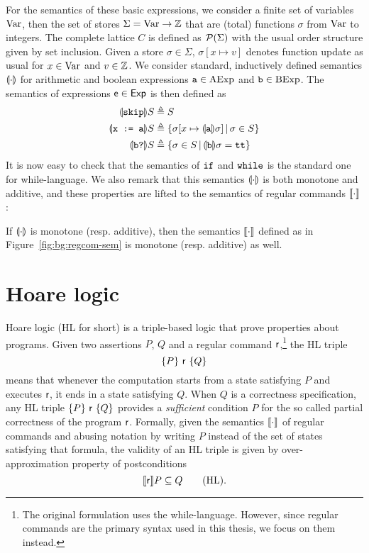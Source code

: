 For the semantics of these basic expressions, we consider a finite set of variables $\text{Var}$, then the set of stores $\Sigma = \text{Var} \rightarrow \mathbb{Z}$ that are (total) functions $\sigma$ from $\text{Var}$ to integers. The complete lattice $C$ is defined as $\mathcal{P}(\Sigma)$ with the usual order structure given by set inclusion. Given a store $\sigma \in \Sigma$, $\sigma[ x \mapsto v ]$ denotes function update as usual for $x \in \text{Var}$ and $v \in \mathbb{Z}$. We consider standard, inductively defined semantics $\llparenthesis\cdot\rrparenthesis$ for arithmetic and boolean expressions $\texttt{a} \in \text{AExp}$ and $\texttt{b} \in \text{BExp}$. The semantics of expressions $\mathsf{e} \in \mathsf{Exp}$ is then defined as
\begin{align*}
	\llparenthesis\texttt{skip}\rrparenthesis S &\triangleq S \\
	\llparenthesis\texttt{x := a}\rrparenthesis S &\triangleq \left\lbrace \sigma[x \mapsto \llparenthesis\texttt{a}\rrparenthesis \sigma] \,\vert\, \sigma \in S \right\rbrace \\
	\llparenthesis\texttt{b?}\rrparenthesis S &\triangleq \left\lbrace \sigma \in S \,\vert\, \llparenthesis\texttt{b}\rrparenthesis \sigma = \texttt{tt} \right\rbrace
\end{align*}
It is now easy to check that the semantics of $\texttt{if}$ and $\texttt{while}$ is the standard one for while-language. We also remark that this semantics $\llparenthesis\cdot\rrparenthesis$ is both monotone and additive, and these properties are lifted to the semantics of regular commands $\llbracket\cdot\rrbracket$:
\begin{prop}
	If $\llparenthesis\cdot\rrparenthesis$ is monotone (resp. additive), then the semantics $\llbracket\cdot\rrbracket$ defined as in Figure~\ref{fig:bg:regcom-sem} is monotone (resp. additive) as well.
\end{prop}

\section{Hoare logic}\label{sec:bg:hl}
Hoare logic (HL for short) \cite{Hoare69} is a triple-based logic that prove properties about programs. Given two assertions $P$, $Q$ and a regular command $\mathsf{r}$,\footnote{The original formulation uses the while-language. However, since regular commands are the primary syntax used in this thesis, we focus on them instead.} the HL triple
\[
\{P\}~\mathsf{r}~\{Q\}
\]
means that whenever the computation starts from a state satisfying $P$ and executes $\mathsf{r}$, it ends in a state satisfying $Q$.
When $Q$ is a correctness specification, any HL triple $\{P\}~\mathsf{r}~\{Q\}$ provides a \emph{sufficient} condition $P$ for the so called partial correctness of the program $\mathsf{r}$.
Formally, given the semantics $\llbracket\cdot\rrbracket$ of regular commands and abusing notation by writing $P$ instead of the set of states satisfying that formula, the validity of an HL triple is given by over-approximation property of postconditions
\[
\llbracket\mathsf{r}\rrbracket P \subseteq Q \tag{HL}\label{eq:bg:hl-validity}.
\]


